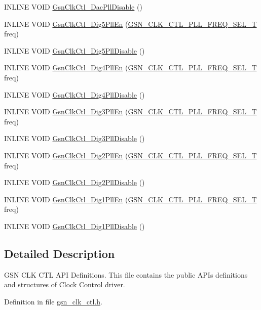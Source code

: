 \begin{DoxyCompactItemize}
\item 
INLINE VOID \hyperlink{a00477_ac66e8d7d9a4d99c9136c2fed774b064c}{GsnClkCtl\_\-DacPllDisable} ()
\item 
INLINE VOID \hyperlink{a00477_af997c6d5edcf89848e43442c744f182b}{GsnClkCtl\_\-Dig5PllEn} (\hyperlink{a00477_ac0f1ee78197c9b51f46253d4b8eefc02}{GSN\_\-CLK\_\-CTL\_\-PLL\_\-FREQ\_\-SEL\_\-T} freq)
\item 
INLINE VOID \hyperlink{a00477_a6f827ca677bbf56fd7bfffc8791a0fff}{GsnClkCtl\_\-Dig5PllDisable} ()
\item 
INLINE VOID \hyperlink{a00477_ad1af5cdcb37f6b830805a2d46388c82e}{GsnClkCtl\_\-Dig4PllEn} (\hyperlink{a00477_ac0f1ee78197c9b51f46253d4b8eefc02}{GSN\_\-CLK\_\-CTL\_\-PLL\_\-FREQ\_\-SEL\_\-T} freq)
\item 
INLINE VOID \hyperlink{a00477_af249ea88f93e1338674dddef55c1f2dc}{GsnClkCtl\_\-Dig4PllDisable} ()
\item 
INLINE VOID \hyperlink{a00477_ac1f7cbd24605ef0ad08562bdc3dabd33}{GsnClkCtl\_\-Dig3PllEn} (\hyperlink{a00477_ac0f1ee78197c9b51f46253d4b8eefc02}{GSN\_\-CLK\_\-CTL\_\-PLL\_\-FREQ\_\-SEL\_\-T} freq)
\item 
INLINE VOID \hyperlink{a00477_a88ac3f6a8bdaccc213912df6d5bb2183}{GsnClkCtl\_\-Dig3PllDisable} ()
\item 
INLINE VOID \hyperlink{a00477_aee9c6554a7c2b12f78f710cde51e6c6d}{GsnClkCtl\_\-Dig2PllEn} (\hyperlink{a00477_ac0f1ee78197c9b51f46253d4b8eefc02}{GSN\_\-CLK\_\-CTL\_\-PLL\_\-FREQ\_\-SEL\_\-T} freq)
\item 
INLINE VOID \hyperlink{a00477_add84b736b9666d8f634e7e55a15d2d69}{GsnClkCtl\_\-Dig2PllDisable} ()
\item 
INLINE VOID \hyperlink{a00477_aff4860c914d33ebb9ddc1524e185bb47}{GsnClkCtl\_\-Dig1PllEn} (\hyperlink{a00477_ac0f1ee78197c9b51f46253d4b8eefc02}{GSN\_\-CLK\_\-CTL\_\-PLL\_\-FREQ\_\-SEL\_\-T} freq)
\item 
INLINE VOID \hyperlink{a00477_a8d71fca59c0fa8540b7cb8fb30cadb24}{GsnClkCtl\_\-Dig1PllDisable} ()
\end{DoxyCompactItemize}


\subsection{Detailed Description}
GSN CLK CTL API Definitions. This file contains the public APIs definitions and structures of Clock Control driver. 

Definition in file \hyperlink{a00477_source}{gsn\_\-clk\_\-ctl.h}.



